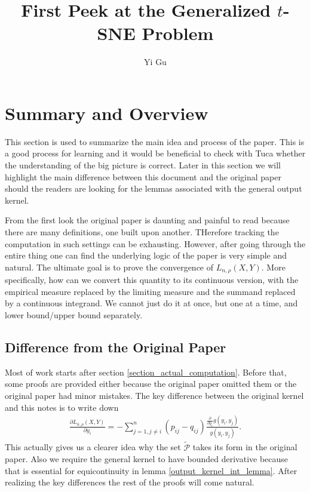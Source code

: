 \documentclass[10pt]{article}
\author{Yi Gu}
\newenvironment{Proof of lemma}{\noindent{\bf Proof of Lemma}}{\hfill$\Box$\newline}
\newenvironment{Proof of claim}{\noindent{\bf Proof of claim}}{\hfill$\Box$\newline}
\newenvironment{Proof of theorem}{\noindent{\bf Proof of Theorem}}{\hfill\scriptsize{$\Box$}\newline}
\newenvironment{Proof of theorems}{\noindent{\bf Proof of Theorems}}{\hfill$\Box$\newline}
\newenvironment{Proof of proposition}{\noindent{\bf Proof of Proposition}}{\hfill$\Box$\newline}
\newenvironment{Proof of propositions}{\noindent{\bf Proof of Propositions}}{\hfill$\Box$\newline}
\newenvironment{Proof of exercise}{\noindent{\it Proof of Exercise:}}{\hfill$\Box$}
\numberwithin{equation}{section}
\begin{document}
\title{First Peek at the Generalized \texorpdfstring{$t$}{Lg}-SNE Problem}
\maketitle
\tableofcontents
\section{Summary and Overview}
This section is used to summarize the main idea and process of the paper. This
is a good process for learning and it would be beneficial to check with Tuca
whether the understanding of the big picture is correct. Later in this section
we will highlight the main difference between this document and the original
paper should the readers are looking for the lemmas associated with the general
output kernel.

From the first look the original paper \cite{auffinger-tsne} is daunting and
painful to read because there are many definitions, one built upon another.
THerefore tracking the computation in such settings can be exhausting. However,
after going through the entire thing one can find the underlying logic of the
paper is very simple and natural. The ultimate goal is to prove the convergence of
$L_{n,\rho}(X,Y)$. More specifically, how can we convert this quantity to its
continuous version, with the empirical measure replaced by the limiting
measure and the summand replaced by a continuous integrand. We cannot just do
it at once, but one at a time, and lower bound/upper bound
separately.
\subsection*{Difference from the Original Paper}
Most of work starts after section \ref{section_actual_computation}. Before
that, some proofs are provided either because the original paper omitted them
or the original paper had minor mistakes. The key difference between the
original kernel and this notes is to write down
\begin{align}
    \frac{\partial L_{n, \rho}(X,Y)}{\partial y_i} = -\sum_{j=1, j \neq i}^n (p_{ij}-q_{ij}) \frac{\frac{\partial}{\partial y_i}g(y_i,y_j)}{g(y_i,y_j)}.
\end{align}
This actually gives us a clearer idea why the set $\tilde{\mathcal{P}}$ takes its form in the original paper. Also we require the general kernel to have bounded derivative because that is essential for equicontinuity in lemma \ref{output_kernel_int_lemma}. After realizing the key differences the rest of the proofs will come natural.
\end{document}
